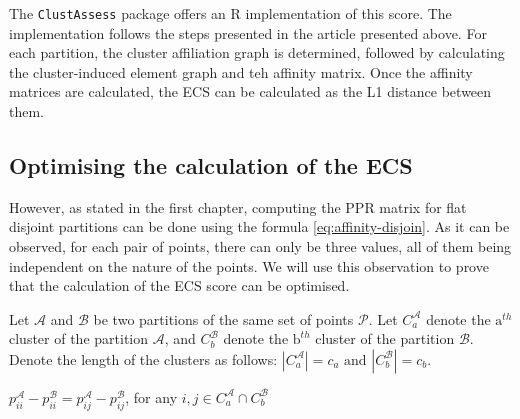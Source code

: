 The \verb|ClustAssess| package offers an R implementation of this score. The implementation follows the steps presented in the article presented above. For each partition, the cluster affiliation graph is determined, followed by calculating the cluster-induced element graph and teh affinity matrix. Once the affinity matrices are calculated, the ECS can be calculated as the L1 distance between them.

\subsection{Optimising the calculation of the ECS}
However, as stated in the first chapter, computing the PPR matrix for flat disjoint partitions can be done using the formula \ref{eq:affinity-disjoin}. As it can be observed, for each pair of points, there can only be three values, all of them being independent on the nature of the points. We will use this observation to prove that the calculation of the ECS score can be optimised.



Let $\mathcal{A}$ and $\mathcal{B}$ be two partitions of the same set of points $\mathcal{P}$. Let $C_a^\mathcal{A}$ denote the $\text{a}^{th}$ cluster of the partition $\mathcal{A}$, and $C_b^\mathcal{B}$ denote the $\text{b}^{th}$ cluster of the partition $\mathcal{B}$. Denote the length of the clusters as follows: $|C_a^{\mathcal{A}}| = c_a \text{ and } |C_b^{\mathcal{B}}| = c_b$.

\begin{remark} \label{remark:pii}
    $p_{ii}^\mathcal{A} - p_{ii}^\mathcal{B} = p_{ij}^\mathcal{A} - p_{ij}^\mathcal{B}$, for any $i, j \in C_a^\mathcal{A} \cap C_b^\mathcal{B}$
\end{remark}

